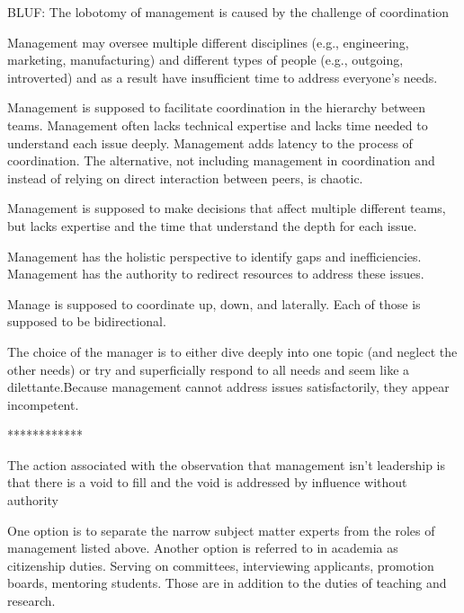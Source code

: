 
BLUF: The lobotomy of management is caused by the challenge of coordination

Management may oversee multiple different disciplines (e.g., engineering, marketing, manufacturing) and different types of people (e.g., outgoing, introverted) and as a result have insufficient time to address everyone's needs. 

Management is supposed to facilitate coordination in the hierarchy between teams. Management often lacks technical expertise and lacks time needed to understand each issue deeply. Management adds latency to the process of coordination. The alternative, not including management in coordination and instead of relying on direct interaction between peers, is chaotic.

Management is supposed to make decisions that affect multiple different teams, but lacks expertise and the time that understand the depth for each issue.

Management has the holistic perspective to identify gaps and inefficiencies. Management has the authority to redirect resources to address these issues.

Manage is supposed to coordinate up, down, and laterally. Each of those is supposed to be bidirectional.

The choice of the manager is to either dive deeply into one topic (and neglect the other needs) or try and superficially respond to all needs and seem like a dilettante.Because management cannot address issues satisfactorily, they appear incompetent.

************

The action associated with the observation that management isn't leadership is that there is a void to fill and the void is addressed by influence without authority

One option is to separate the narrow subject matter experts from the roles of management listed above. Another option is referred to in academia as citizenship duties. Serving on committees, interviewing applicants, promotion boards, mentoring students. Those are in addition to the duties of teaching and research.
 
